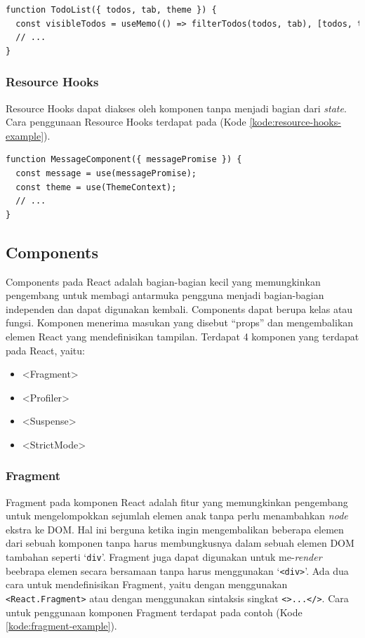 \begin{lstlisting}[language=HTML, caption=Contoh Potongan Kode Performance Hooks, label=kode:performance-hooks-example]
function TodoList({ todos, tab, theme }) {
  const visibleTodos = useMemo(() => filterTodos(todos, tab), [todos, tab]);
  // ...
}
\end{lstlisting}

\subsubsection{Resource Hooks}
\label{subsubsec:resource-hooks}
Resource Hooks dapat diakses oleh komponen tanpa menjadi bagian dari \textit{state}. Cara penggunaan Resource Hooks terdapat pada (Kode \ref{kode:resource-hooks-example}).

\begin{lstlisting}[language=HTML, caption=Contoh Potongan Kode Resource Hooks, label=kode:resource-hooks-example]
function MessageComponent({ messagePromise }) {
  const message = use(messagePromise);
  const theme = use(ThemeContext);
  // ...
}
\end{lstlisting}

\subsection{Components}
Components pada React adalah bagian-bagian kecil yang memungkinkan pengembang untuk membagi antarmuka pengguna menjadi bagian-bagian independen dan dapat digunakan kembali. Components dapat berupa kelas atau fungsi. Komponen menerima masukan yang disebut ``props'' dan mengembalikan elemen React yang mendefinisikan tampilan. Terdapat 4 komponen yang terdapat pada React, yaitu:
\begin{itemize}
    \item <Fragment>
    \item <Profiler>
    \item <Suspense>
    \item <StrictMode>
\end{itemize}

\subsubsection{Fragment}
Fragment pada komponen React adalah fitur yang memungkinkan pengembang untuk mengelompokkan sejumlah elemen anak tanpa perlu menambahkan \textit{node} ekstra ke DOM. Hal ini berguna ketika ingin mengembalikan beberapa elemen dari sebuah komponen tanpa harus membungkusnya dalam sebuah elemen DOM tambahan seperti `\texttt{div}'. Fragment juga dapat digunakan untuk me-\textit{render} beebrapa elemen secara bersamaan tanpa harus menggunakan `\texttt{<div>}'. Ada dua cara untuk mendefinisikan Fragment, yaitu dengan menggunakan \texttt{<React.Fragment>} atau dengan menggunakan sintaksis singkat \texttt{<>...</>}. Cara untuk penggunaan komponen Fragment terdapat pada contoh (Kode \ref{kode:fragment-example}).

